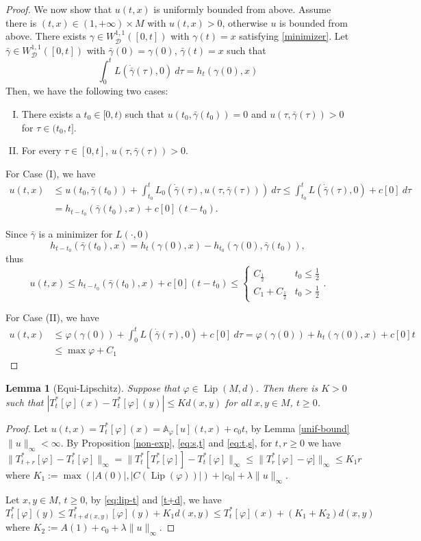 \documentclass[12pt]{amsart}
\theoremstyle{plain}
\newtheorem{lemma}{Lemma}
\theoremstyle{definition}
\newcommand{\A}{\mathbb A}
\newcommand{\cD}{\mathcal D}
\newcommand{\cW}{W^{1,1}}
\newcommand{\cWD}{\cW_\cD}
\newcommand{\fui}{\varphi}
\newcommand{\ga}{\gamma}
\newcommand{\la}{\lambda}
\newcommand{\Lip}{\operatorname{Lip}}
\begin{document}
\begin{proof}
We now show that $u(t,x)$ is uniformly bounded from above.
Assume  there is $(t,x)\in (1,+\infty)\times M$ with $u(t,x) > 0$,
otherwise $u$ is bounded from above.
There exists $\ga\in\cWD([0,t])$ with $\ga(t)=x$ satisfying \eqref{minimizer}.
Let $\bar{\ga}\in\cWD([0,t])$ with $\bar\ga(0)=\ga(0)$, $\bar\ga(t)=x$
such that
\[\int_0^tL(\dot{\bar\ga}(\tau), 0)\ d\tau=h_t(\ga(0),x)\]
Then, we have the following two cases:
\begin{enumerate}[(I)]
\item There exists a $t_0\in [0,t)$ such that
  $u(t_0,\bar\ga(t_0)) = 0$ and $u(\tau,\bar\ga(\tau))>0$ for $\tau\in (t_0,t]$.
\item For every $\tau\in[0,t]$,  $u(\tau,\bar\ga(\tau)) > 0$.
\end{enumerate}
 For Case (I), we have
\begin{align*}
  u(t,x) &\le u(t_0,\bar\ga(t_0))
     +\int_{t_0}^t L_0(\dot{\bar\ga}(\tau), u(\tau,\bar\ga(\tau)))\ d\tau
       \le\int_{t_0}^t L(\dot{\bar\ga}(\tau),0)+c[0]\ d\tau\\
       &=h_{t-t_0}(\bar\ga(t_0), x) +c[0](t-t_0).
\end{align*}

Since $\bar\ga$ is a minimizer for $L(\cdot,0)$
\[h_{t- t_0}(\bar\ga(t_0), x)=h_t(\ga(0),x)-h_{t_0}(\ga(0), \bar\ga(t_0)),\]
thus
\[u(t,x)\le h_{t-t_0}(\bar\ga(t_0),x) +c[0](t-t_0)\le
  \begin{cases}
 C_\frac12    &t_0\le\frac 12\\
 C_1+ C_\frac 12&t_0>\frac 12
\end{cases}.\]


For Case (II), we have
\begin{align*}
  u(t,x) 
       &\le\fui(\ga(0))+ \int_0^t L(\dot{\bar\ga}(\tau),0)+c[0]\ d\tau=
         \fui(\ga(0))+h_t(\ga(0), x) +c[0]t\\
&\le \max\fui+C_1 
\end{align*}
\end{proof}
\begin{lemma}[Equi-Lipschitz]\label{equiLip}
  Suppose that $\fui\in\Lip(M,d)$. Then there is $K>0$ such that
  $|T^*_t[\fui](x)-T^*_t[\fui](y)|\le K d(x,y)$ for all $x,y\in M$,
  $t\ge 0$. 
  \end{lemma}
  \begin{proof}
    Let  $u(t,x)=T^*_t[\fui](x)=\A_\fui[u](t,x)+c_0t$, by
    Lemma \ref{unif-bound} $\|u\|_\infty<\infty$.
    By Proposition \ref{non-exp}, \eqref{eq:s,t} and \eqref{eq:t,s}, for $t,r\ge 0$ we have
    \begin{equation}
      \label{eq:lip-t}
      \|T^*_{t+r}[\fui]-T^*_t[\fui]\|_\infty=\|T^*_t[T^*_r[\fui]]-T^*_t[\fui]\|_\infty\le
      \|T^*_r[\fui]-\fui]\|_\infty\le K_1r
          \end{equation}
where $K_1:=\max (|A(0)|,|C(\Lip(\fui))|)+|c_0|+\la \|u\|_\infty$.

Let $x,y\in M$, $t\ge 0$, by \eqref{eq:lip-t} and \eqref{t+d},  we have
\[T^*_t[\fui](y)\le T^*_{t+d(x,y)}[\fui](y)+K_1 d(x,y)\le T^*_t[\fui](x)+(K_1+K_2)d(x,y)\]
where $K_2:=A(1)+c_0+\la\|u\|_\infty$.
  \end{proof}
\end{document}
